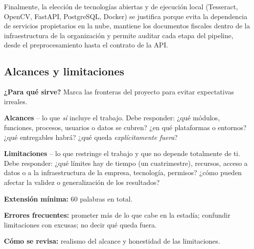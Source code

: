 Finalmente, la elección de tecnologías abiertas y de ejecución local (Tesseract, OpenCV, FastAPI, PostgreSQL, Docker) se justifica porque evita la dependencia de servicios propietarios en la nube, mantiene los documentos fiscales dentro de la infraestructura de la organización y permite auditar cada etapa del pipeline, desde el preprocesamiento hasta el contrato de la API\cite{tesseract_ocr, fastapi_docs}.


\subsection{Alcances y limitaciones} \label{sec:alcances_limitaciones} %

\begin{guia}
\textbf{¿Para qué sirve?} Marca las fronteras del proyecto para evitar expectativas irreales.

\textbf{Alcances} -- lo que \emph{sí} incluye el trabajo. Debe responder: ¿qué módulos, funciones, procesos, usuarios o
datos se cubren? ¿en qué plataformas o entornos? ¿qué entregables habrá? ¿qué queda \emph{explícitamente fuera}?

\textbf{Limitaciones} -- lo que restringe el trabajo y que no depende totalmente de ti. Debe responder: ¿qué límites hay
de tiempo (un cuatrimestre), recursos, acceso a datos o a la infraestructura de la empresa, tecnología, permisos?
¿cómo pueden afectar la validez o generalización de los resultados?

\textbf{Extensión mínima:} 60 palabras en total.

\textbf{Errores frecuentes:} prometer más de lo que cabe en la estadía; confundir limitaciones con excusas; no decir qué
queda fuera.

\textbf{Cómo se revisa:} realismo del alcance y honestidad de las limitaciones.
\end{guia}

